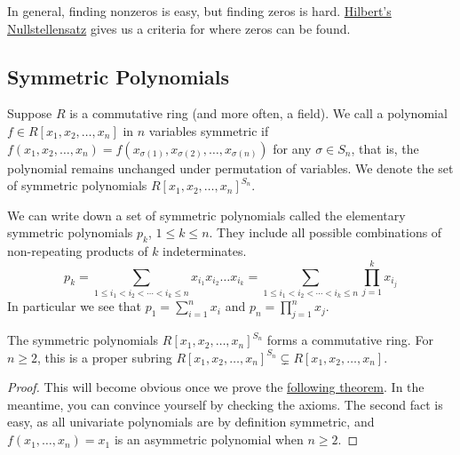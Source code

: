 \begin{remark}
    In general, finding nonzeros is easy, but finding zeros is hard.
    \hyperref[thm:nullstellensatz]{Hilbert's Nullstellensatz}
    gives us a criteria for where zeros can be found.
\end{remark}

\subsection*{Symmetric Polynomials}

\begin{definition}
    Suppose \(R\) is a commutative ring (and more often, a field).
    We call a polynomial \(f \in R[x_1,x_2,\hdots,x_n]\) in \(n\) variables
    symmetric if \(f(x_1,x_2,\hdots,x_n)
    = f(x_{\sigma(1)},x_{\sigma(2)},\hdots,x_{\sigma(n)})\)
    for any \(\sigma \in S_n\),
    that is, the polynomial remains unchanged under permutation of variables.
    We denote the set of symmetric polynomials \({R[x_1,x_2,\hdots,x_n]}^{S_n}\).
\end{definition}
\begin{definition}
    We can write down a set of symmetric polynomials called
    the elementary symmetric polynomials \(p_k\), \(1 \leq k \leq n\).
    They include all possible combinations of
    non-repeating products of \(k\) indeterminates.
    \begin{equation*}
        p_k = \sum_{1 \leq i_1 < i_2 < \cdots < i_k \leq n}
        x_{i_1}x_{i_2} \hdots x_{i_k}
        = \sum_{1 \leq i_1 < i_2 < \cdots < i_k \leq n}
        \prod_{j=1}^k x_{i_j}
    \end{equation*}
    In particular we see that \(p_1 = \sum_{i=1}^n x_i\)
    and \(p_n = \prod_{j=1}^n x_j\).
\end{definition}
\begin{proposition}
    The symmetric polynomials \({R[x_1,x_2,\hdots,x_n]}^{S_n}\)
    forms a commutative ring.
    For \(n \geq 2\),
    this is a proper subring \({R[x_1,x_2,\hdots,x_n]}^{S_n}
    \subsetneq R[x_1,x_2,\hdots,x_n]\).
\end{proposition}
\begin{proof}
    This will become obvious once we prove
    the \hyperref[thm:fundamental-sym-polynomial]{following theorem}.
    In the meantime,
    you can convince yourself by checking the axioms.
    The second fact is easy,
    as all univariate polynomials are by definition symmetric,
    and \(f(x_1,\hdots,x_n) = x_1\) is an asymmetric polynomial
    when \(n \geq 2\).
\end{proof}

